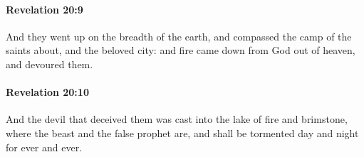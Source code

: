 		\paragraph{Revelation 20:9} %
			\label{REVELATIONNT-20-9}

			And they went up on the breadth of the earth, and compassed the camp of the saints about, and the beloved city: and fire came down from God out of heaven, and devoured them.

			\begin{framed}
			\scriptsize
				\begin{compactdesc}
					\item[SBLG] 
				\end{compactdesc}
			\end{framed}

		\paragraph{Revelation 20:10} %
			\label{REVELATIONNT-20-10}

			And the devil that deceived them was cast into the lake of fire and brimstone, where the beast and the false prophet are, and shall be tormented day and night for ever and ever.

